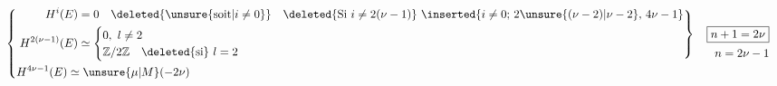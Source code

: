 
\[
\begin{aligned}
&\left\{\begin{aligned}
&\left.\begin{aligned}
H^i(E)&=0 \quad \deleted{\unsure{\text{soit}|i\ne0}}\quad
 \deleted{\text{Si }i\ne2(\nu-1)}\ 
 \inserted{i\ne0;\,2\unsure{(\nu-2)|\nu-2},\,4\nu-1}\\
H^{2(\nu-1)}(E)&\simeq\begin{cases}
0,\ l\ne 2\\
\mathbb Z/2\mathbb Z\quad \deleted{\text{si}}\ l=2
\end{cases}
\end{aligned}\right\}\\
&H^{4\nu-1}(E)\simeq\unsure{\mu|M}(-2\nu)
\end{aligned}\right.
&&\begin{aligned}\boxed{n+1=2\nu}\\ n=2\nu-1\end{aligned}
\end{aligned}
\]

